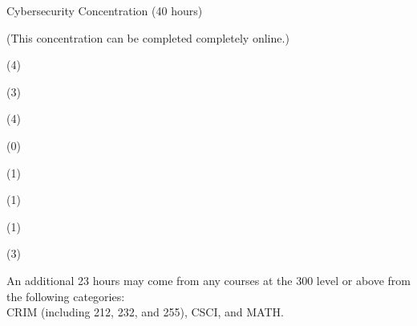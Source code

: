 \begin{reqgroup}{Cybersecurity Concentration (40 hours)}
\begin{center}%
(This concentration can be completed completely online.)\vspace{-0.5em}%
\end{center}%
\begin{checklist}
\begin{minipage}[t]{0.5\linewidth}
	\item (4) 
	\item (3) 
	\item (4) 
	\item (0) 
\end{minipage}
\begin{minipage}[t]{0.5\linewidth}
	\item (1) 
	\item (1) 
	\item (1) 
	\item (3) 
\end{minipage}
\end{checklist}

\tcblower{}

An additional 23 hours may come from any courses at the 300 level or above from the following categories:\\CRIM (including 212, 232, and 255), CSCI, and MATH\@.
\begin{checklist}
\begin{minipage}[t]{0.5\linewidth}
	\blankReq{}
	\blankReq{}
	\blankReq{}
	\blankReq{}
\end{minipage}
\begin{minipage}[t]{0.5\linewidth}
	\blankReq{}
	\blankReq{}
	\blankReq{}
	\blankReq{}
\end{minipage}
\end{checklist}
\end{reqgroup}

